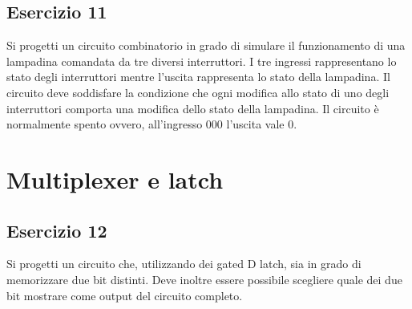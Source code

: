 \documentclass{article}
\begin{document}
\subsection*{Esercizio 11}
Si progetti un circuito combinatorio in grado di simulare il funzionamento di una lampadina comandata da tre diversi interruttori. I tre ingressi rappresentano lo stato degli interruttori mentre l’uscita rappresenta lo stato della lampadina. Il circuito deve soddisfare la condizione che ogni modifica allo stato di uno degli interruttori comporta una modifica dello stato della lampadina. Il circuito è normalmente spento ovvero, all'ingresso 000 l'uscita vale 0.

\section*{Multiplexer e latch}
\subsection*{Esercizio 12}
Si progetti un circuito che, utilizzando dei gated D latch, sia in grado di memorizzare due bit distinti. Deve inoltre essere possibile scegliere quale dei due bit mostrare come output del circuito completo.
\end{document}
